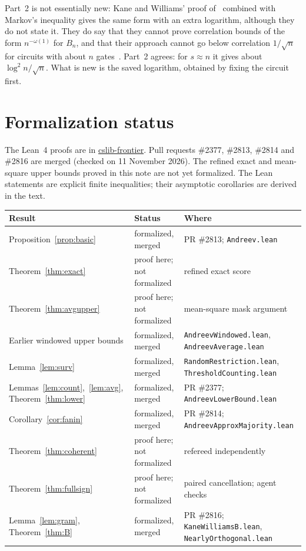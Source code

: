 \documentclass[11pt,letterpaper]{article}
\theoremstyle{remark}
\newcommand{\sect}[1]{\section{\texorpdfstring{\color{ink}#1}{#1}}}
\begin{document}
Part~2 is not essentially new: Kane and Williams' proof
of~\cite[Cor.~6.2]{KW} combined with Markov's inequality gives the same form
with an extra logarithm, although they do not state it. They do say that they
cannot prove correlation bounds of the form $n^{-\omega(1)}$ for $B_n$, and
that their approach cannot go below correlation $1/\sqrt n$ for circuits with
about $n$ gates~\cite[Section~6]{KW}. Part~2 agrees: for $s\approx n$ it
gives about $\log^2n/\sqrt n$. What is new is the saved logarithm, obtained
by fixing the circuit first.

\sect{Formalization status}\label{sec:lean}

The Lean~4 proofs are in \href{https://github.com/cslib-community/cslib-frontier}{cslib-frontier}. Pull requests
\#2377, \#2813, \#2814 and \#2816 are merged (checked on 11 November 2026). The refined exact and mean-square upper bounds proved in
this note are not yet formalized. The Lean statements are explicit finite
inequalities; their asymptotic corollaries are derived in the text.

\begin{center}
\small
\renewcommand{\arraystretch}{1.2}
\begin{tabular}{@{}P{0.30\textwidth}P{0.23\textwidth}P{0.40\textwidth}@{}}
\toprule
Result & Status & Where\\
\midrule
Proposition~\ref{prop:basic} & formalized, merged & PR \#2813; \texttt{Andreev.lean}\\
Theorem~\ref{thm:exact} & proof here; not formalized & refined exact score\\
Theorem~\ref{thm:avgupper} & proof here; not formalized & mean-square mask argument\\
Earlier windowed upper bounds & formalized, merged & \texttt{AndreevWindowed.lean}, \texttt{AndreevAverage.lean}\\
Lemma~\ref{lem:surv} & formalized, merged & \texttt{RandomRestriction.lean}, \texttt{ThresholdCounting.lean}\\
Lemmas~\ref{lem:count},~\ref{lem:avg}, Theorem~\ref{thm:lower} & formalized, merged & PR \#2377; \texttt{AndreevLowerBound.lean}\\
Corollary~\ref{cor:fanin} & formalized, merged & PR \#2814; \texttt{AndreevApproxMajority.lean}\\
Theorem~\ref{thm:coherent} & proof here; not formalized & refereed independently\\
Theorem~\ref{thm:fullsign} & proof here; not formalized & paired cancellation; agent checks\\
Lemma~\ref{lem:gram}, Theorem~\ref{thm:B} & formalized, merged & PR \#2816; \texttt{KaneWilliamsB.lean}, \texttt{NearlyOrthogonal.lean}\\
\bottomrule
\end{tabular}
\end{center}
\end{document}
